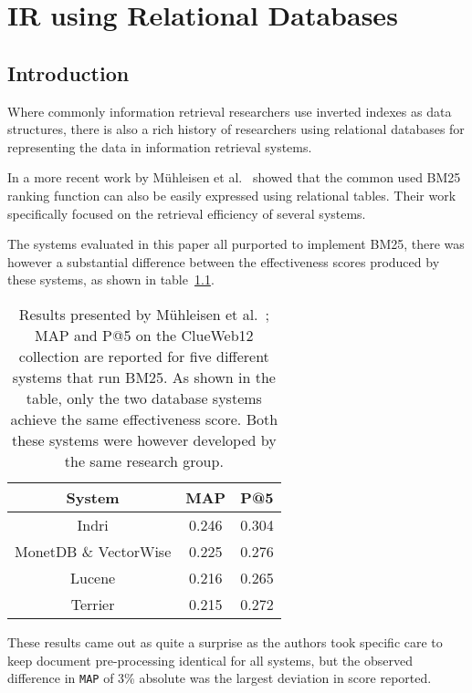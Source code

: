 \chapter{IR using Relational Databases}
\section{Introduction}
Where commonly information retrieval researchers use inverted indexes as data structures, there is also a rich history of researchers using relational databases for representing the data in information retrieval systems. 


In a more recent work by M\"{u}hleisen et al.~\cite{OldDog} showed that the common used BM25 ranking function can also be easily expressed using relational tables. Their work specifically focused on the retrieval efficiency of several systems.   

The systems evaluated in this paper all purported to implement BM25, there was however a substantial difference between the effectiveness scores produced by these systems, as shown in table~\ref{olddog_results}. 

\begin{table}
	\centering
	\caption{Results presented by M\"{u}hleisen et al.~\cite{OldDog}; MAP and P@5 on the ClueWeb12 collection are reported for five different systems that run BM25. As shown in the table, only the two database systems achieve the same effectiveness score. Both these systems were however developed by the same research group.}
	\label{olddog_results}
	\begin{tabular}{c c c}
		\toprule
		System &  MAP & P@5 \\
		\midrule
		Indri & 0.246 & 0.304 \\
		MonetDB \& VectorWise & 0.225 & 0.276 \\
		Lucene & 0.216 & 0.265 \\
		Terrier & 0.215 & 0.272 \\
		\bottomrule
	\end{tabular}
\end{table}

These results came out as quite a surprise as the authors took specific care to keep document pre-processing identical for all systems, but the observed difference in \texttt{MAP} of 3\% absolute was the largest deviation in score reported.


